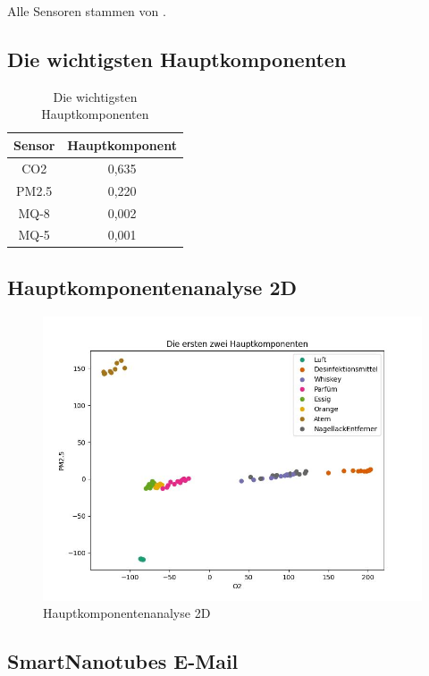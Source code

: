 \documentclass[10pt]{article}
\begin{document}
\bigskip
Alle Sensoren stammen von \autocite{MQSensoren}.


\label{PCA}
\subsection{Die wichtigsten Hauptkomponenten}

\begin{table}[H]
\centering
{}
\begin{tabular}{cc}
Sensor & Hauptkomponent \\
\hline
CO2 & 0,635 \\
PM2.5 & 0,220 \\
MQ-8 & 0,002 \\
MQ-5 & 0,001 \\

\end{tabular}
\caption{Die wichtigsten Hauptkomponenten}
\label{PCA-Tabelle}
\end{table}


\label{Hauptkomponentenanalyse-2D}
\subsection{Hauptkomponentenanalyse 2D}

\begin{figure}[H]
\centering
\includegraphics[scale=0.9]{Bilder/Wichtigkeit der Sensoren 2D.jpeg}
\caption{Hauptkomponentenanalyse 2D}
\end{figure}


\label{SmartNanotubes E-Mail}
\subsection{SmartNanotubes E-Mail}
\end{document}
